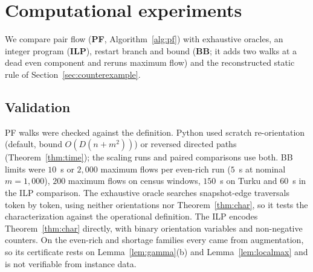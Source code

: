 \section{Computational experiments}\label{sec:eval}

We compare pair flow (\textbf{PF}, Algorithm~\ref{alg:pf}) with exhaustive oracles, an integer program (\textbf{ILP}), restart branch and bound (\textbf{BB}; it adds two walks at a dead even component and reruns maximum flow) and the reconstructed static rule of Section~\ref{sec:counterexample}.

\subsection{Validation}\label{sec:exp-correct}

PF \YES{} walks were checked against the definition. Python used scratch re-orientation (default, bound $O(D(n+m^2))$) or reversed directed paths (Theorem~\ref{thm:time}); the scaling runs and paired comparisons use both. BB limits were $10$~s or $2{,}000$ maximum flows per even-rich run ($5$~s at nominal $m=1{,}000$), $200$ maximum flows on census windows, $150$~s on Turku and $60$~s in the ILP comparison. The exhaustive oracle searches snapshot-edge traversals token by token, using neither orientations nor Theorem~\ref{thm:char}, so it tests the characterization against the operational definition. The ILP encodes Theorem~\ref{thm:char} directly, with binary orientation variables and non-negative counters. On the even-rich and shortage families every \NO{} came from augmentation, so its certificate rests on Lemma~\ref{lem:gamma}(b) and Lemma~\ref{lem:localmax} and is not verifiable from instance data.

